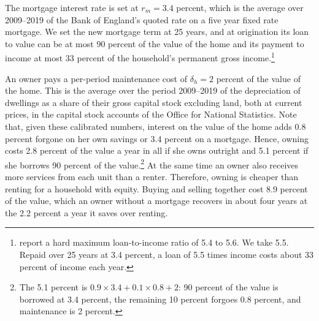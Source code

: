 The mortgage interest rate is set at $r_m=3.4$ percent, which is the average over 2009--2019 of the Bank of England's quoted rate on a five year fixed rate mortgage. We set the new mortgage term at 25 years, and at origination its loan to value can be at most 90 percent of the value of the home \citep{attanasio2012modelling} and its payment to income at most 33 percent of the household's permanent gross income.\footnote{\citet{carro2023macroprudential} report a hard maximum loan-to-income ratio of 5.4 to 5.6. We take 5.5. Repaid over 25 years at 3.4 percent, a loan of 5.5 times income costs about 33 percent of income each year.}

An owner pays a per-period maintenance cost of $\delta_h=2$ percent of the value of the home. This is the average over the period 2009--2019 of the depreciation of dwellings as a
share of their gross capital stock excluding land, both at current prices,
in the capital stock accounts of the Office for National Statistics.
Note that, given these calibrated numbers, interest on the value of the home adds 0.8 percent forgone on her own
savings or 3.4 percent on a mortgage. Hence, owning costs 2.8 percent of the value a year in all if she owns
outright and 5.1 percent if she borrows 90 percent of the value.\footnote{The 5.1 percent is $0.9\times3.4+0.1\times0.8+2$: 90 percent of the value is borrowed at 3.4 percent, the remaining 10 percent forgoes 0.8 percent, and maintenance is 2 percent.} At the same time an owner
also receives more services from each unit
than a renter. Therefore, owning is
cheaper than renting for a household with equity.  Buying and selling together cost 8.9 percent of the value, which an owner without a mortgage
recovers in about four years at the 2.2 percent a year it saves over
renting.

